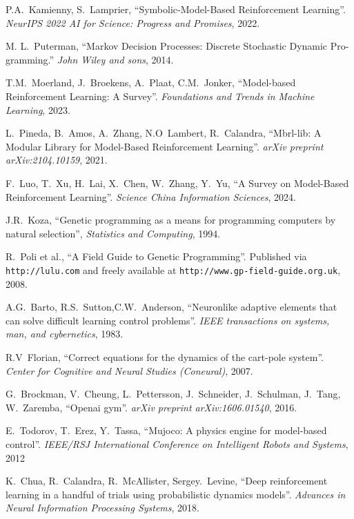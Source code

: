 \documentclass[11pt]{article}
\begin{document}

\begin{thebibliography}{10}
	P.A.~Kamienny, S.~Lamprier, ``Symbolic-Model-Based Reinforcement Learning''.
	{\em NeurIPS 2022 AI for Science: Progress and Promises}, 2022.
	
	M. L.~Puterman, ``Markov Decision Processes: Discrete Stochastic Dynamic Pro-
	gramming.'' {\em John Wiley and sons}, 2014.
	
	T.M.~Moerland, J.~Broekens, A.~Plaat, C.M.~Jonker, ``Model-based Reinforcement Learning: A Survey''. {\em Foundations and Trends in Machine Learning}, 2023.
	
	L.~Pineda, B.~Amos, A.~Zhang, N.O~Lambert, R.~Calandra, ``Mbrl-lib: A Modular Library for Model-Based Reinforcement Learning''. {\em arXiv preprint arXiv:2104.10159}, 2021.
	
	F.~Luo, T.~Xu, H.~Lai, X.~Chen, W.~Zhang, Y.~Yu, ``A Survey on Model-Based Reinforcement Learning''. {\em Science China Information Sciences}, 2024.
	
	J.R.~Koza, ``Genetic programming as a means for programming computers by natural selection'', 
	{\em Statistics and Computing}, 1994.
	
	R.~Poli et al., ``A Field Guide to Genetic Programming''.
	\newblock Published via \texttt{http://lulu.com} and freely available at \texttt{http://www.gp-field-guide.org.uk}, 2008.
	
	A.G.~Barto, R.S.~Sutton,C.W.~Anderson, ``Neuronlike adaptive elements that can solve difficult learning control problems''. {\em IEEE transactions on systems, man, and cybernetics}, 1983.
	
	R.V~Florian, ``Correct equations for the dynamics of the cart-pole system''. {\em Center for Cognitive and Neural Studies (Coneural)}, 2007.
	
	G.~Brockman, V.~Cheung, L.~Pettersson, J.~Schneider, J.~Schulman, J.~Tang, W.~Zaremba, ``Openai gym''. {\em arXiv preprint arXiv:1606.01540}, 2016.
	
	E.~Todorov, T.~Erez, Y.~Tassa, ``Mujoco: A physics engine for model-based control''. {\em IEEE/RSJ International Conference on Intelligent Robots and Systems}, 2012
	
	K.~Chua, R.~Calandra, R.~McAllister, Sergey.~Levine, ``Deep reinforcement learning in a handful of trials using probabilistic dynamics models''. {\em Advances in Neural Information Processing Systems}, 2018.
	

\end{thebibliography}
\end{document}
